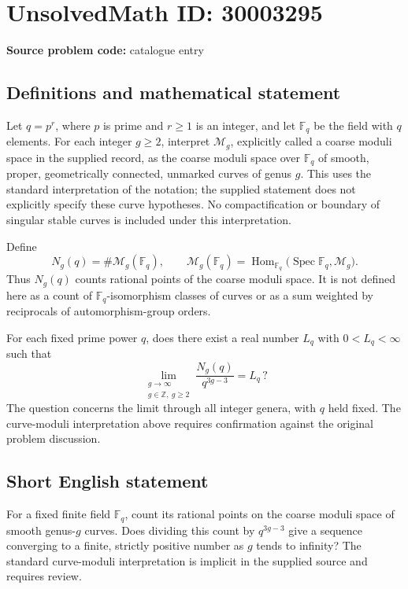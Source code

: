 \documentclass[11pt]{article}
\newcommand{\Z}{\mathbb{Z}}
\newcommand{\F}{\mathbb{F}}
\begin{document}
\section*{UnsolvedMath ID: 30003295}
\textbf{Source problem code:} catalogue entry
\subsection{Definitions and mathematical statement}
Let \(q=p^r\), where \(p\) is prime and \(r\geq 1\) is an integer, and let \(\F_q\) be the field with \(q\) elements. For each integer \(g\geq 2\), interpret \(\mathcal M_g\), explicitly called a coarse moduli space in the supplied record, as the coarse moduli space over \(\F_q\) of smooth, proper, geometrically connected, unmarked curves of genus \(g\). This uses the standard interpretation of the notation; the supplied statement does not explicitly specify these curve hypotheses. No compactification or boundary of singular stable curves is included under this interpretation.

Define
\[
N_g(q)=\#\mathcal M_g(\F_q),
\qquad
\mathcal M_g(\F_q)=\operatorname{Hom}_{\F_q}\bigl(\operatorname{Spec}\F_q,\mathcal M_g\bigr).
\]
Thus \(N_g(q)\) counts rational points of the coarse moduli space. It is not defined here as a count of \(\F_q\)-isomorphism classes of curves or as a sum weighted by reciprocals of automorphism-group orders.

For each fixed prime power \(q\), does there exist a real number \(L_q\) with \(0<L_q<\infty\) such that
\[
\lim_{\substack{g\to\infty\\g\in\Z,\ g\geq 2}}
\frac{N_g(q)}{q^{3g-3}}=L_q\,?
\]
The question concerns the limit through all integer genera, with \(q\) held fixed. The curve-moduli interpretation above requires confirmation against the original problem discussion.
\subsection{Short English statement}
For a fixed finite field \(\F_q\), count its rational points on the coarse moduli space of smooth genus-\(g\) curves. Does dividing this count by \(q^{3g-3}\) give a sequence converging to a finite, strictly positive number as \(g\) tends to infinity? The standard curve-moduli interpretation is implicit in the supplied source and requires review.
\end{document}
